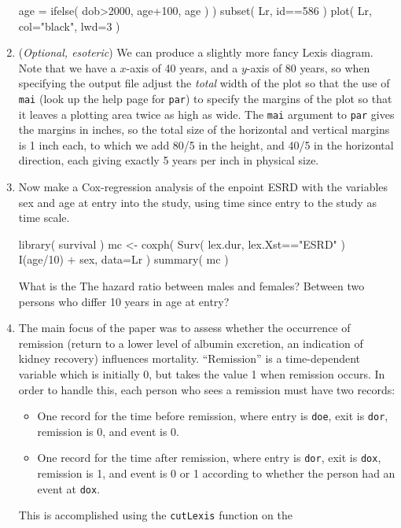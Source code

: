 \begin{enumerate}
\begin{Schunk}
\begin{Sinput}
                      age = ifelse( dob>2000, age+100, age ) )
 subset( Lr, id==586 )
 plot( Lr, col="black", lwd=3 )
\end{Sinput}
\end{Schunk}
\item (\emph{Optional, esoteric}) We can produce a slightly more
  fancy Lexis diagram. Note that we have a $x$-axis of 40 years, and
  a $y$-axis of 80 years, so when specifying the output file adjust
  the \emph{total} width of the plot so that the use of \texttt{mai}
  (look up the help page for \texttt{par}) to specify the margins of
  the plot so that it leaves a plotting area twice as high as wide. The
  \texttt{mai} argument to \texttt{par} gives the margins in inches,
  so the total size of the horizontal and vertical margins is 1
  inch each, to which we add 80/5 in the height, and 40/5 in the
  horizontal direction, each giving exactly 5 years per inch in
  physical size.
\item Now make a Cox-regression analysis of the enpoint ESRD with
  the variables sex and age at entry into the study, using time
  since entry to the study as time scale.
\begin{Schunk}
\begin{Sinput}
 library( survival )
 mc <- coxph( Surv( lex.dur, lex.Xst=="ESRD" ) ~
              I(age/10) + sex, data=Lr )
 summary( mc )
\end{Sinput}
\end{Schunk}
What is the The hazard ratio between males and females?
Between two persons who differ 10 years in age at entry?
\item The main focus of the paper was to assess whether the occurrence of
  remission (return to a lower level of albumin excretion, an
  indication of kidney recovery) influences mortality.
  ``Remission'' is a time-dependent variable which is initially 0, but
  takes the value 1 when remission occurs. In order to handle this, each
  person who sees a remission must have two records:
  \begin{itemize}
  \item One record for the time before remission, where entry is
    \texttt{doe}, exit is \texttt{dor}, remission is 0, and event is
    0.
  \item One record for the time after remission, where entry is
    \texttt{dor}, exit is \texttt{dox}, remission is 1, and event is 0
    or 1 according to whether the person had an event at \texttt{dox}.
  \end{itemize}
  This is accomplished using the \texttt{cutLexis} function on the

\end{enumerate}
